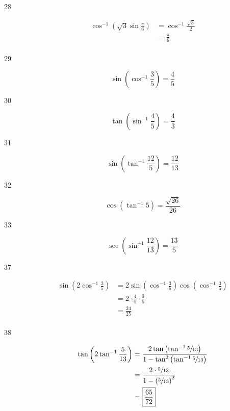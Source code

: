 \documentclass{exam}
\begin{document}
\begin{description}
      \item[28] 
        \begin{align*}
          \cos^{-1} \left( \sqrt{3} \sin \frac{\pi}{6} \right) & = \cos^{-1} \frac{\sqrt{3}}{2} \\
                                                               & = \boxed{ \frac{\pi}{6} } \\
        \end{align*}

      \item[29]
        \[
          \sin \left( \cos^{-1} \frac{3}{5} \right) = \boxed{ \frac{4}{5} } 
        \]

      \item[30]
        \[
          \tan \left( \sin^{-1} \frac{4}{5} \right) = \boxed{ \frac{4}{3} } 
        \]

      \item[31]
        \[
          \sin \left( \tan^{-1} \frac{12}{5} \right) = \boxed{ \frac{12}{13} } 
        \]

      \item[32]
        \[
          \cos \left( \tan^{-1} 5 \right) = \boxed{ \frac{\sqrt{26}}{26} } 
        \]

      \item[33]
        \[
          \sec \left( \sin^{-1} \frac{12}{13} \right) = \boxed{ \frac{13}{5} } 
        \]

      \item[37]
        \begin{align*}
          \sin \left( 2 \cos^{-1} \frac{3}{5} \right) & = 2 \sin \left( \cos^{-1} \frac{3}{5} \right) \cos \left( \cos^{-1} \frac{3}{5} \right) \\
                                                      & = 2 \cdot \frac{4}{5} \cdot \frac{3}{5} \\
                                                      & = \boxed{ \frac{24}{25} } \\
        \end{align*}

      \item[38]
        \begin{align*}
          \tan \left( 2 \tan^{-1} \frac{5}{13} \right) & = \frac{ 2 \tan \left( \tan^{-1} \sfrac{5}{13} \right) }
                                                                { 1 - \tan^2 \left( \tan^{-1} \sfrac{5}{13} \right) } \\
                                                       & = \frac{ 2 \cdot \sfrac{5}{13} }{1 - \left( \sfrac{5}{13} \right)^2 } \\
                                                       & = \boxed{ \frac{65}{72} } \\
        \end{align*}

    \end{description}
\end{document}
